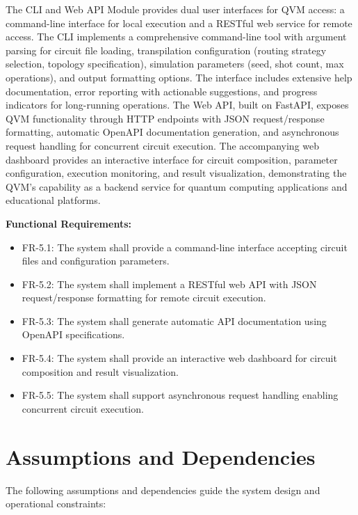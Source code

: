 The CLI and Web API Module provides dual user interfaces for QVM access: a command-line interface for local execution and a RESTful web service for remote access. The CLI implements a comprehensive command-line tool with argument parsing for circuit file loading, transpilation configuration (routing strategy selection, topology specification), simulation parameters (seed, shot count, max operations), and output formatting options. The interface includes extensive help documentation, error reporting with actionable suggestions, and progress indicators for long-running operations. The Web API, built on FastAPI, exposes QVM functionality through HTTP endpoints with JSON request/response formatting, automatic OpenAPI documentation generation, and asynchronous request handling for concurrent circuit execution. The accompanying web dashboard provides an interactive interface for circuit composition, parameter configuration, execution monitoring, and result visualization, demonstrating the QVM's capability as a backend service for quantum computing applications and educational platforms.

\textbf{Functional Requirements:}

\begin{itemize}
    \item FR-5.1: The system shall provide a command-line interface accepting circuit files and configuration parameters.
    \item FR-5.2: The system shall implement a RESTful web API with JSON request/response formatting for remote circuit execution.
    \item FR-5.3: The system shall generate automatic API documentation using OpenAPI specifications.
    \item FR-5.4: The system shall provide an interactive web dashboard for circuit composition and result visualization.
    \item FR-5.5: The system shall support asynchronous request handling enabling concurrent circuit execution.
\end{itemize}



\section{Assumptions and Dependencies}

The following assumptions and dependencies guide the system design and operational constraints:

